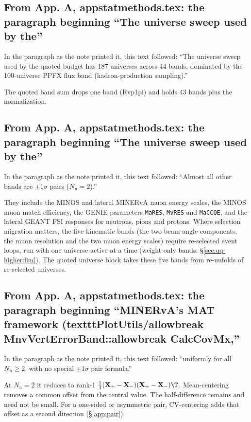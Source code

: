 \subsection{From App. A, appstatmethods.tex: the paragraph beginning ``The universe sweep used by the''}
In the paragraph as the note printed it, this text followed: ``The universe sweep used by the quoted budget has 187 universes across 44 bands, dominated by the $100$-universe PPFX flux band (hadron-production sampling).''\par
The quoted band sum drops one band (Rvp1pi) and holds $43$ bands plus the normalization.

\subsection{From App. A, appstatmethods.tex: the paragraph beginning ``The universe sweep used by the''}
In the paragraph as the note printed it, this text followed: ``Almost all other bands are $\pm1\sigma$ pairs ($N_{u}=2$).''\par
They include the MINOS and lateral MINERvA muon energy scales, the MINOS muon-match efficiency, the GENIE parameters \texttt{MaRES}, \texttt{MvRES} and \texttt{MaCCQE}, and the lateral GEANT FSI responses for neutrons, pions and protons. Where selection migration matters, the five kinematic bands (the two beam-angle components, the muon resolution and the two muon energy scales) require re-selected event loops, run with one universe active at a time (weight-only bands: \S\ref{sec:uq-higherdim}). The quoted universe block takes these five bands from re-unfolds of re-selected universes.

\subsection{From App. A, appstatmethods.tex: the paragraph beginning ``MINERvA's MAT framework (textttPlotUtils/allowbreak MnvVertErrorBand::allowbreak CalcCovMx,''}
In the paragraph as the note printed it, this text followed: ``uniformly for all $N_{u}\ge 2$, with no special $\pm1\sigma$ pair formula.''\par
At $N_{u}=2$ it reduces to rank-1 $\tfrac14(\mathbf{X}_{+}-\mathbf{X}_{-})(\mathbf{X}_{+}-\mathbf{X}_{-})\T$. Mean-centering removes a common offset from the central value. The half-difference remains and need not be small. For a one-sided or asymmetric pair, CV-centering adds that offset as a second direction (\S\ref{app:pair}).

